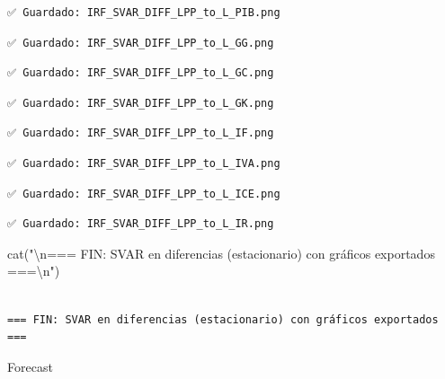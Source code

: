 \documentclass[
  spanish,
  letterpaper,
  DIV=11,
  numbers=noendperiod]{scrartcl}
\newenvironment{Shaded}{\begin{snugshade}}{\end{snugshade}}
\newcommand{\FunctionTok}[1]{\textcolor[rgb]{0.28,0.35,0.67}{#1}}
\newcommand{\NormalTok}[1]{\textcolor[rgb]{0.00,0.23,0.31}{#1}}
\newcommand{\SpecialCharTok}[1]{\textcolor[rgb]{0.37,0.37,0.37}{#1}}
\newcommand{\StringTok}[1]{\textcolor[rgb]{0.13,0.47,0.30}{#1}}
\begin{document}
\begin{verbatim}
✅ Guardado: IRF_SVAR_DIFF_LPP_to_L_PIB.png
\end{verbatim}

\begin{verbatim}
✅ Guardado: IRF_SVAR_DIFF_LPP_to_L_GG.png
\end{verbatim}

\begin{verbatim}
✅ Guardado: IRF_SVAR_DIFF_LPP_to_L_GC.png
\end{verbatim}

\begin{verbatim}
✅ Guardado: IRF_SVAR_DIFF_LPP_to_L_GK.png
\end{verbatim}

\begin{verbatim}
✅ Guardado: IRF_SVAR_DIFF_LPP_to_L_IF.png
\end{verbatim}

\begin{verbatim}
✅ Guardado: IRF_SVAR_DIFF_LPP_to_L_IVA.png
\end{verbatim}

\begin{verbatim}
✅ Guardado: IRF_SVAR_DIFF_LPP_to_L_ICE.png
\end{verbatim}

\begin{verbatim}
✅ Guardado: IRF_SVAR_DIFF_LPP_to_L_IR.png
\end{verbatim}

\begin{Shaded}
\begin{Highlighting}[]
\FunctionTok{cat}\NormalTok{(}\StringTok{"}\SpecialCharTok{\textbackslash{}n}\StringTok{=== FIN: SVAR en diferencias (estacionario) con gráficos exportados ===}\SpecialCharTok{\textbackslash{}n}\StringTok{"}\NormalTok{)}
\end{Highlighting}
\end{Shaded}

\begin{verbatim}

=== FIN: SVAR en diferencias (estacionario) con gráficos exportados ===
\end{verbatim}

Forecast
\end{document}
